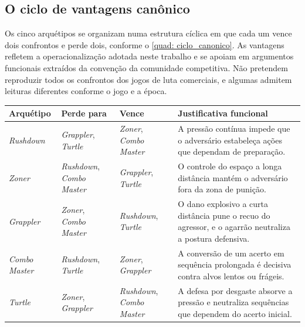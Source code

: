 \subsection{O ciclo de vantagens canônico}

Os cinco arquétipos se organizam numa estrutura cíclica em que cada um vence dois confrontos e perde dois, conforme o \autoref{quad: ciclo_canonico}. As vantagens refletem a operacionalização adotada neste trabalho e se apoiam em argumentos funcionais extraídos da convenção da comunidade competitiva. Não pretendem reproduzir todos os confrontos dos jogos de luta comerciais, e algumas admitem leituras diferentes conforme o jogo e a época.

\begin{quadro}[ht]
    \caption{Ciclo canônico de vantagens entre os cinco arquétipos adotados.}
    \label{quad: ciclo_canonico}
    \centering

    \begin{tabularx}{\textwidth}{>{\raggedright\arraybackslash}p{2.4cm} >{\raggedright\arraybackslash}p{3.3cm} >{\raggedright\arraybackslash}p{3.3cm} >{\raggedright\arraybackslash}X}
        \hline
        \bfseries Arquétipo & \bfseries Perde para & \bfseries Vence & \bfseries Justificativa funcional \\
        \hline
        \textit{Rushdown}     & \textit{Grappler}, \textit{Turtle}     & \textit{Zoner}, \textit{Combo Master}   & A pressão contínua impede que o adversário estabeleça ações que dependam de preparação. \\
        \textit{Zoner}        & \textit{Rushdown}, \textit{Combo Master} & \textit{Grappler}, \textit{Turtle}      & O controle do espaço a longa distância mantém o adversário fora da zona de punição. \\
        \textit{Grappler}     & \textit{Zoner}, \textit{Combo Master}  & \textit{Rushdown}, \textit{Turtle}      & O dano explosivo a curta distância pune o recuo do agressor, e o agarrão neutraliza a postura defensiva. \\
        \textit{Combo Master} & \textit{Rushdown}, \textit{Turtle}     & \textit{Zoner}, \textit{Grappler}       & A conversão de um acerto em sequência prolongada é decisiva contra alvos lentos ou frágeis. \\
        \textit{Turtle}       & \textit{Zoner}, \textit{Grappler}      & \textit{Rushdown}, \textit{Combo Master} & A defesa por desgaste absorve a pressão e neutraliza sequências que dependem do acerto inicial. \\
        \hline
    \end{tabularx}

    \source
\end{quadro}


